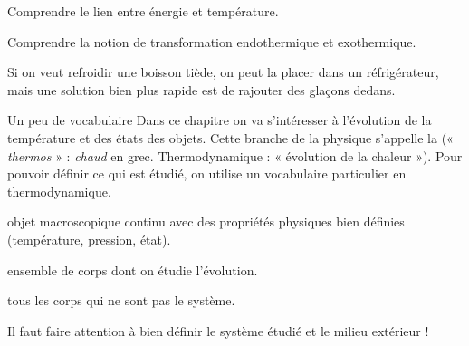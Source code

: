 \teteSndTran

\vspace*{-32pt}

\begin{objectifs}
  \item Comprendre le lien entre énergie et température.
  \item Comprendre la notion de transformation endothermique et exothermique.
\end{objectifs}

\begin{contexte}
  Si on veut refroidir une boisson tiède, on peut la placer dans un réfrigérateur, mais une solution bien plus rapide est de rajouter des glaçons dedans.
  
\end{contexte}


\begin{doc}{Un peu de vocabulaire}
  Dans ce chapitre on va s'intéresser à l'évolution de la température et des états des objets.
  Cette branche de la physique s'appelle la  (« \textit{thermos} » : \textit{chaud} en grec. Thermodynamique : « évolution de la chaleur »).
  Pour pouvoir définir ce qui est étudié, on utilise un vocabulaire particulier en thermodynamique.
  
  \begin{importants}
    \begin{listePoints}
      \item {} objet macroscopique continu avec des propriétés physiques bien définies (température, pression, état).
      \item {} ensemble de corps dont on étudie l'évolution.
      \item {} tous les corps qui ne sont pas le système.
    \end{listePoints}
  \end{importants}
  \attention Il faut faire attention à bien définir le système étudié et le milieu extérieur !
\end{doc}

